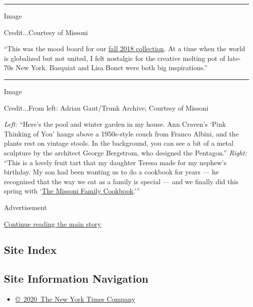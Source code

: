\begin{center}\rule{0.5\linewidth}{\linethickness}\end{center}

Image

Credit...Courtesy of Missoni

``This was the mood board for our
\href{https://www.nytimes3xbfgragh.onion/slideshow/2018/02/24/fashion/runway-womens/missoni-m-w-fall-2018.html}{fall
2018 collection}. At a time when the world is globalized but not united,
I felt nostalgic for the creative melting pot of late-70s New York.
Basquiat and Lisa Bonet were both big inspirations.''

\begin{center}\rule{0.5\linewidth}{\linethickness}\end{center}

Image

Credit...From left: Adrian Gaut/Trunk Archive; Courtesy of Missoni

\emph{Left:} ``Here's the pool and winter garden in my house. Ann
Craven's `Pink Thinking of You' hangs above a 1950s-style couch from
Franco Albini, and the plants rest on vintage stools. In the background,
you can see a bit of a metal sculpture by the architect George
Bergstrom, who designed the Pentagon.'' \emph{Right:} ``This is a lovely
fruit tart that my daughter Teresa made for my nephew's birthday. My son
had been wanting us to do a cookbook for years --- he recognized that
the way we eat as a family is special --- and we finally did this spring
with
`\href{https://www.nytimes3xbfgragh.onion/2018/04/23/dining/missoni-family-cookbook.html}{The
Missoni Family Cookbook}.'''

Advertisement

\protect\hyperlink{after-bottom}{Continue reading the main story}

\hypertarget{site-index}{%
\subsection{Site Index}\label{site-index}}

\hypertarget{site-information-navigation}{%
\subsection{Site Information
Navigation}\label{site-information-navigation}}

\begin{itemize}
\tightlist
\item
  \href{https://help.nytimes3xbfgragh.onion/hc/en-us/articles/115014792127-Copyright-notice}{©~2020~The
  New York Times Company}
\end{itemize}

